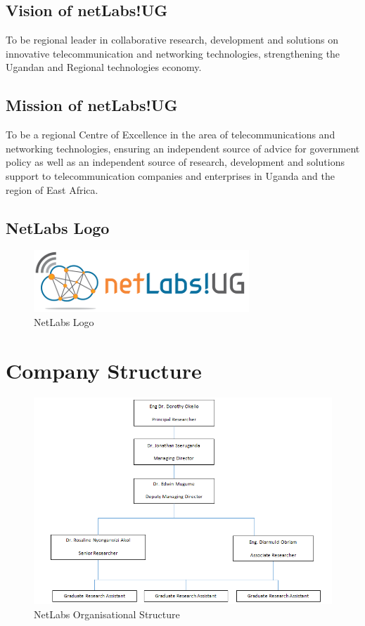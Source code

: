 \subsection{Vision of netLabs!UG}
To be regional leader in collaborative research, development and solutions on innovative telecommunication and networking technologies, strengthening the Ugandan
and Regional technologies economy.

\subsection{Mission of netLabs!UG}
To be a regional Centre of Excellence in the area of telecommunications and networking technologies, ensuring an independent source of advice for government
policy as well as an independent source of research, development and solutions support to telecommunication companies and enterprises in Uganda and the region of
East Africa.

\subsection{NetLabs Logo}

\begin{figure}[H]
    \centering
    \includegraphics{images/netlabs-logo.png}
    \caption{NetLabs Logo}
\end{figure}


\section{Company Structure}

\begin{figure}[H]
    \centering
    \includegraphics{images/netlabs-struct.png}
    \caption{NetLabs Organisational Structure}
    \label{fig:netlabs-struct}
\end{figure}

